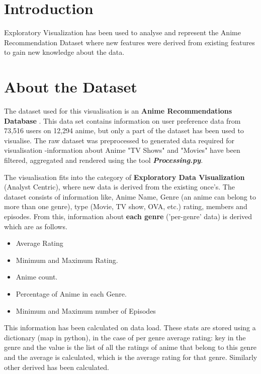 \documentclass[a4paper, 10pt]{article}
\begin{document}


\section{Introduction}
    Exploratory Visualization has been used to analyse and represent the Anime Recommendation Dataset where new features were derived from existing features to gain new knowledge about the data.

\section{About the Dataset}
    \qquad The dataset used for this visualisation is an \textbf{Anime Recommendations Database} \cite{anime-dataset}. This data set contains information on user preference data from 73,516 users on 12,294 anime, but only a part of the dataset has been used to visualise. The raw dataset was preprocessed to generated data required for visualisation -information about Anime "TV Shows" and "Movies" have been filtered, aggregated and rendered using the tool \textbf{\textit{Processing.py}}. 
    
    \qquad The visualisation fits into the category of \textbf{Exploratory Data Visualization} (Analyst Centric), where new data is derived from the existing once's. The dataset consists of information like, Anime Name, Genre (an anime can belong to more than one genre), type (Movie, TV show, OVA, etc.) rating, members and episodes. From this, information about \textbf{each genre} ('per-genre' data) is derived which are as follows.
    \begin{itemize}
    \item Average Rating
    \item Minimum and Maximum Rating.
    \item Anime count.
    \item Percentage of Anime in each Genre.
    \item Minimum and Maximum number of Episodes
    \end{itemize}
    \qquad This information has been calculated on data load. These stats are stored using a dictionary (map in python), in the case of per genre average rating: key in the genre and the value is the list of all the ratings of anime that belong to this genre and the average is calculated, which is the average rating for that genre. Similarly other derived has been calculated.
    
\end{document}

